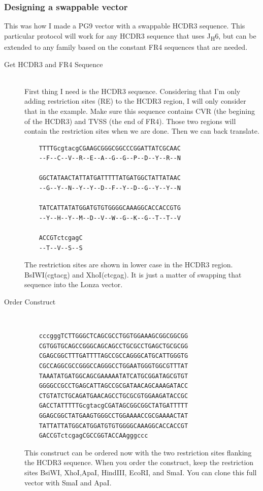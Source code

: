 \subsubsection{Designing a swappable vector}
This was how I made a PG9 vector with a swappable HCDR3 sequence. This particular protocol will work for any HCDR3 sequence that uses J\textsubscript{H}6, but can be extended to any family based on the constant FR4 sequences that are needed.
\begin{description}
  \item[Get HCDR3 and FR4 Sequence] \hfill \\
  First thing I need is the HCDR3 sequence. Considering that I'm only adding restriction sites (RE) to the HCDR3 region, I will only consider that in the example. Make sure this sequence contains CVR (the begining of the HCDR3) and TVSS (the end of FR4). Those two regions will contain the restriction sites when we are done. Then we can back translate.
    \begin{verbatim}
    TTTTGcgtacgCGAAGCGGGCGGCCCGGATTATCGCAAC
    --F--C--V--R--E--A--G--G--P--D--Y--R--N

    GGCTATAACTATTATGATTTTTATGATGGCTATTATAAC
    --G--Y--N--Y--Y--D--F--Y--D--G--Y--Y--N

    TATCATTATATGGATGTGTGGGGCAAAGGCACCACCGTG
    --Y--H--Y--M--D--V--W--G--K--G--T--T--V

    ACCGTctcgagC
    --T--V--S--S
    \end{verbatim}
 The restriction sites are shown in lower case in the HCDR3 region. BsIWI(cgtacg) and XhoI(ctcgag). It is just a matter of swapping that sequence into the Lonza vector.
 \item[Order Construct] \hfill \\
    \begin{verbatim}
    cccgggTCTTGGGCTCAGCGCCTGGTGGAAAGCGGCGGCGG
    CGTGGTGCAGCCGGGCAGCAGCCTGCGCCTGAGCTGCGCGG
    CGAGCGGCTTTGATTTTAGCCGCCAGGGCATGCATTGGGTG
    CGCCAGGCGCCGGGCCAGGGCCTGGAATGGGTGGCGTTTAT
    TAAATATGATGGCAGCGAAAAATATCATGCGGATAGCGTGT
    GGGGCCGCCTGAGCATTAGCCGCGATAACAGCAAAGATACC
    CTGTATCTGCAGATGAACAGCCTGCGCGTGGAAGATACCGC
    GACCTATTTTTGcgtacgCGATAGCGGCGGCTATGATTTTT
    GGAGCGGCTATGAAGTGGGCCTGGAAAACCGCGAAAACTAT
    TATTATTATGGCATGGATGTGTGGGGCAAAGGCACCACCGT
    GACCGTctcgagCGCCGGTACCAAgggccc
    \end{verbatim}
 This construct can be ordered now with the two restriction sites flanking the HCDR3 sequence. When you order the construct, keep the restriction sites BsiWI, XhoI,ApaI, HindIII, EcoRI, and SmaI. You can clone this full vector with SmaI and ApaI.
\end{description}



